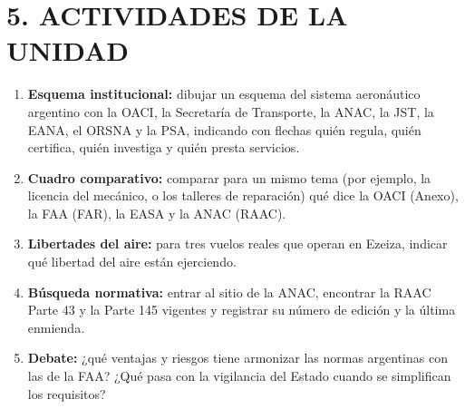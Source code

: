 \section*{5. ACTIVIDADES DE LA UNIDAD}
\begin{enumerate}
  \item \textbf{Esquema institucional:} dibujar un esquema del sistema aeronáutico argentino con
        la OACI, la Secretaría de Transporte, la ANAC, la JST, la EANA, el ORSNA y la PSA,
        indicando con flechas quién regula, quién certifica, quién investiga y quién presta
        servicios.
  \item \textbf{Cuadro comparativo:} comparar para un mismo tema (por ejemplo, la licencia del
        mecánico, o los talleres de reparación) qué dice la OACI (Anexo), la FAA (FAR), la EASA
        y la ANAC (RAAC).
  \item \textbf{Libertades del aire:} para tres vuelos reales que operan en Ezeiza, indicar qué
        libertad del aire están ejerciendo.
  \item \textbf{Búsqueda normativa:} entrar al sitio de la ANAC, encontrar la RAAC Parte 43 y la
        Parte 145 vigentes y registrar su número de edición y la última enmienda.
  \item \textbf{Debate:} ¿qué ventajas y riesgos tiene armonizar las normas argentinas con las de
        la FAA? ¿Qué pasa con la vigilancia del Estado cuando se simplifican los requisitos?
\end{enumerate}
